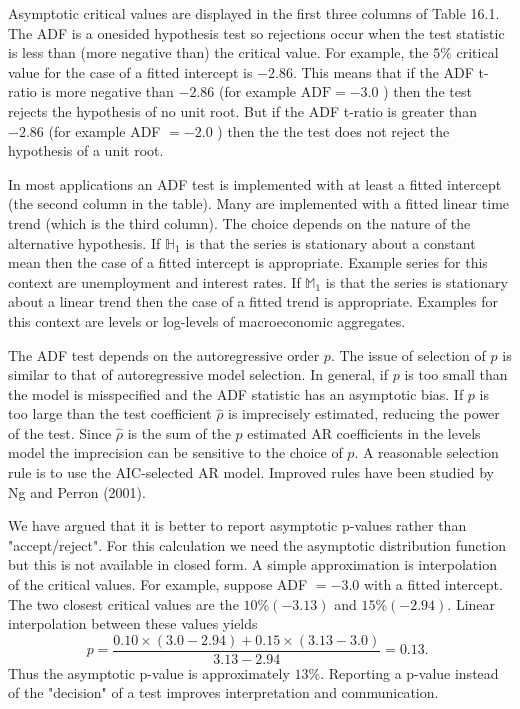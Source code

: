 \documentclass[10pt]{article}
\begin{document}
Asymptotic critical values are displayed in the first three columns of Table 16.1. The ADF is a onesided hypothesis test so rejections occur when the test statistic is less than (more negative than) the critical value. For example, the $5 \%$ critical value for the case of a fitted intercept is $-2.86$. This means that if the ADF t-ratio is more negative than $-2.86$ (for example $\mathrm{ADF}=-3.0$ ) then the test rejects the hypothesis of no unit root. But if the ADF t-ratio is greater than $-2.86$ (for example ADF $=-2.0$ ) then the the test does not reject the hypothesis of a unit root.

In most applications an ADF test is implemented with at least a fitted intercept (the second column in the table). Many are implemented with a fitted linear time trend (which is the third column). The choice depends on the nature of the alternative hypothesis. If $\mathbb{H}_{1}$ is that the series is stationary about a constant mean then the case of a fitted intercept is appropriate. Example series for this context are unemployment and interest rates. If $\mathbb{M}_{1}$ is that the series is stationary about a linear trend then the case of a fitted trend is appropriate. Examples for this context are levels or log-levels of macroeconomic aggregates.

The ADF test depends on the autoregressive order $p$. The issue of selection of $p$ is similar to that of autoregressive model selection. In general, if $p$ is too small than the model is misspecified and the ADF statistic has an asymptotic bias. If $p$ is too large than the test coefficient $\widehat{\rho}$ is imprecisely estimated, reducing the power of the test. Since $\widehat{\rho}$ is the sum of the $p$ estimated AR coefficients in the levels model the imprecision can be sensitive to the choice of $p$. A reasonable selection rule is to use the AIC-selected AR model. Improved rules have been studied by Ng and Perron (2001).

We have argued that it is better to report asymptotic p-values rather than "accept/reject". For this calculation we need the asymptotic distribution function but this is not available in closed form. A simple approximation is interpolation of the critical values. For example, suppose ADF $=-3.0$ with a fitted intercept. The two closest critical values are the $10 \%(-3.13)$ and $15 \%(-2.94)$. Linear interpolation between these values yields
$$
p=\frac{0.10 \times(3.0-2.94)+0.15 \times(3.13-3.0)}{3.13-2.94}=0.13 \text {. }
$$
Thus the asymptotic p-value is approximately $13 \%$. Reporting a p-value instead of the "decision" of a test improves interpretation and communication.
\end{document}
